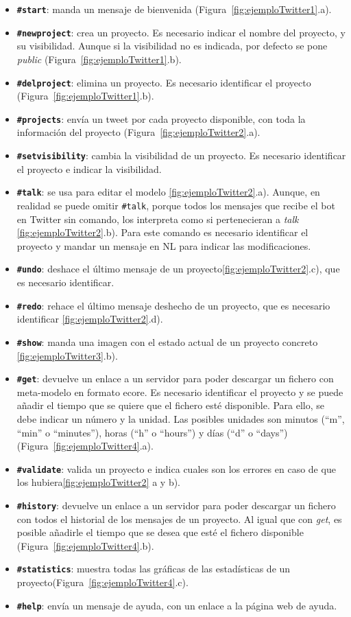 \begin{itemize}
\item \textbf{\texttt{\#start}}: manda un mensaje de bienvenida (Figura~\ref{fig:ejemploTwitter1}.a).
\item \textbf{\texttt{\#newproject}}: crea un proyecto. Es necesario indicar el nombre del proyecto, y su visibilidad. Aunque si la visibilidad no es indicada, por defecto se pone \textit{public} (Figura~\ref{fig:ejemploTwitter1}.b).
\item \textbf{\texttt{\#delproject}}: elimina un proyecto. Es necesario identificar el proyecto (Figura~\ref{fig:ejemploTwitter1}.b).
\item \textbf{\texttt{\#projects}}: envía un tweet por cada proyecto disponible, con toda la información del proyecto (Figura~\ref{fig:ejemploTwitter2}.a).
\item \textbf{\texttt{\#setvisibility}}: cambia la visibilidad de un proyecto. Es necesario identificar el proyecto e indicar la visibilidad. 
\item \textbf{\texttt{\#talk}}: se usa para editar el modelo \ref{fig:ejemploTwitter2}.a). Aunque, en realidad se puede omitir \texttt{\#talk}, porque todos los mensajes que recibe el bot en Twitter sin comando, los interpreta como si pertenecieran a \textit{talk} \ref{fig:ejemploTwitter2}.b). Para este comando es necesario identificar el proyecto y mandar un mensaje en NL para indicar las modificaciones.
\item \textbf{\texttt{\#undo}}: deshace el último mensaje de un proyecto\ref{fig:ejemploTwitter2}.c), que es necesario identificar.
\item \textbf{\texttt{\#redo}}: rehace el último mensaje deshecho de un proyecto, que es necesario identificar  \ref{fig:ejemploTwitter2}.d).
\item \textbf{\texttt{\#show}}: manda una imagen con el estado actual de un proyecto concreto \ref{fig:ejemploTwitter3}.b).
\item \textbf{\texttt{\#get}}: devuelve un enlace a un servidor para poder descargar un fichero con meta-modelo en formato ecore. Es necesario identificar el proyecto y se puede añadir el tiempo que se quiere que el fichero esté disponible. Para ello, se debe indicar un número y la unidad. Las posibles unidades son minutos (``m'', ``min'' o ``minutes''), horas (``h'' o ``hours'') y días (``d'' o ``days'') (Figura~\ref{fig:ejemploTwitter4}.a). 
\item \textbf{\texttt{\#validate}}: valida un proyecto e indica cuales son los errores en caso de que los hubiera\ref{fig:ejemploTwitter2} a y b).
\item \textbf{\texttt{\#history}}: devuelve un enlace a un servidor para poder descargar un fichero con todos el historial de los mensajes de un proyecto. Al igual que con \textit{get}, es posible añadirle el tiempo que se desea que esté el fichero disponible (Figura~\ref{fig:ejemploTwitter4}.b).
\item \textbf{\texttt{\#statistics}}: muestra todas las gráficas de las estadísticas de un proyecto(Figura~\ref{fig:ejemploTwitter4}.c). 
\item \textbf{\texttt{\#help}}: envía un mensaje de ayuda, con un enlace a la página web de ayuda. 
\end{itemize}
